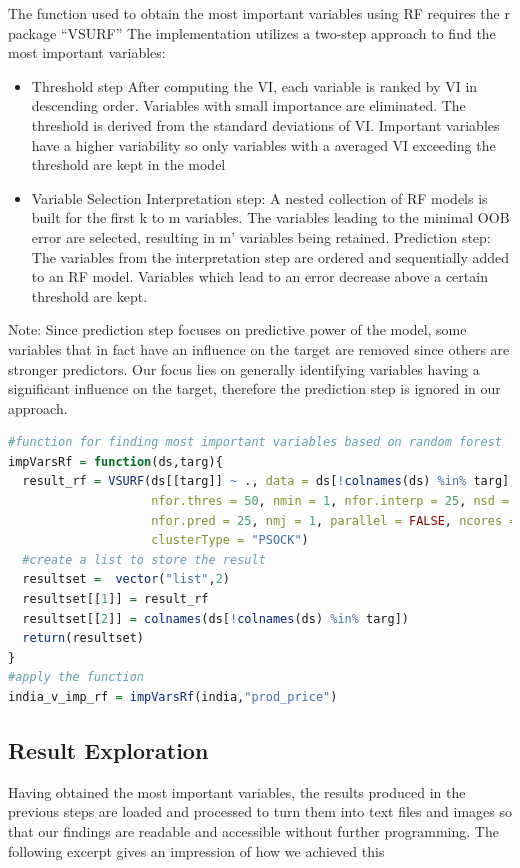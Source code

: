 \documentclass[12pt,a4paper,english]{article}
\begin{document}
The function used to obtain the most important variables using RF requires the r package “VSURF” 
The implementation utilizes a two-step approach to find the most important variables:
\begin{itemize}
\item Threshold step
After computing the VI, each variable is ranked by VI in descending order.
Variables with small importance are eliminated. The threshold is derived from the standard deviations of VI. Important variables have a higher variability so only variables with a averaged VI exceeding the threshold are kept in the model
\item Variable Selection
Interpretation step: 
A nested collection of RF models is built for the first k to m variables. The variables leading to the minimal OOB error are selected, resulting in m’ variables being retained.
Prediction step:
The variables from the interpretation step are ordered and sequentially added to an RF model. Variables which lead to an error decrease above a certain threshold are kept.
\end{itemize}
Note: Since prediction step focuses on predictive power of the model, some variables that in fact have an influence on the target are removed since others are stronger predictors. Our focus lies on generally identifying variables having a significant influence on the target, therefore the prediction step is ignored in our approach.

\begin{lstlisting}[language= R, captionpos=b,caption=\href{https://github.com/jaidikam/sps_ws1718/tree/master/Qfolder5}{SPL\_Q5\_india\_impvar\_rf}]
#function for finding most important variables based on random forest  
impVarsRf = function(ds,targ){
  result_rf = VSURF(ds[[targ]] ~ ., data = ds[!colnames(ds) %in% targ], ntree = 2000,
                    nfor.thres = 50, nmin = 1, nfor.interp = 25, nsd = 1,
                    nfor.pred = 25, nmj = 1, parallel = FALSE, ncores = detectCores() - 1,
                    clusterType = "PSOCK")
  #create a list to store the result
  resultset =  vector("list",2)  
  resultset[[1]] = result_rf
  resultset[[2]] = colnames(ds[!colnames(ds) %in% targ])
  return(resultset)
}
#apply the function
india_v_imp_rf = impVarsRf(india,"prod_price")
\end{lstlisting}

\subsection{Result Exploration}
Having obtained the most important variables, the results produced in the previous steps are loaded and processed to turn them into text files and images so that our findings are readable and accessible without further programming.
The following excerpt gives an impression of how we achieved this
\end{document}
